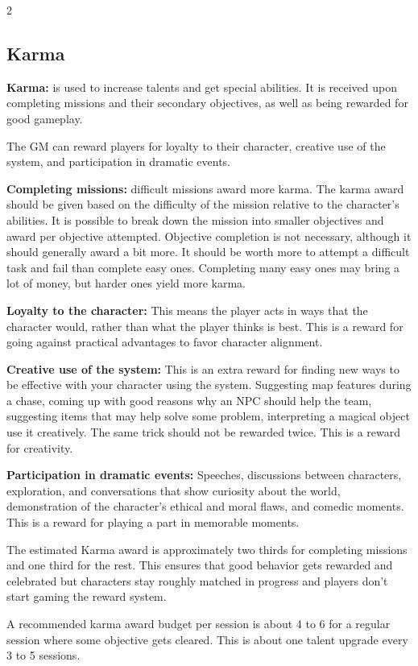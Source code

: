 \begin{multicols}{2}
\subsection{Karma}

\textbf{Karma:} is used to increase talents and get special abilities. It is received upon completing missions and their secondary objectives, as well as being rewarded for good gameplay.

The GM can reward players for loyalty to their character, creative use of the system, and participation in dramatic events.

\textbf{Completing missions:} difficult missions award more karma. The karma award should be given based on the difficulty of the mission relative to the character's abilities. It is possible to break down the mission into smaller objectives and award per objective attempted. Objective completion is not necessary, although it should generally award a bit more. It should be worth more to attempt a difficult task and fail than complete easy ones. Completing many easy ones may bring a lot of money, but harder ones yield more karma.

\textbf{Loyalty to the character:} This means the player acts in ways that the character would, rather than what the player thinks is best. This is a reward for going against practical advantages to favor character alignment.

\textbf{Creative use of the system:} This is an extra reward for finding new ways to be effective with your character using the system. Suggesting map features during a chase, coming up with good reasons why an NPC should help the team, suggesting items that may help solve some problem, interpreting a magical object use it creatively. The same trick should not be rewarded twice. This is a reward for creativity.

\textbf{Participation in dramatic events:} Speeches, discussions between characters, exploration, and conversations that show curiosity about the world, demonstration of the character's ethical and moral flaws, and comedic moments. This is a reward for playing a part in memorable moments.

The estimated Karma award is approximately two thirds for completing missions and one third for the rest. This ensures that good behavior gets rewarded and celebrated but characters stay roughly matched in progress and players don't start gaming the reward system. 

A recommended karma award budget per session is about 4 to 6 for a regular session where some objective gets cleared. This is about one talent upgrade every 3 to 5 sessions.


\end{multicols}
